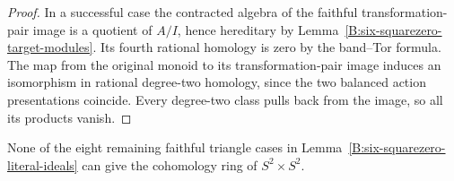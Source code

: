 \begin{proof}
In a successful case the contracted algebra of the faithful
transformation-pair image is a quotient of $A/I$, hence hereditary
by Lemma~\ref{B:six-squarezero-target-modules}.  Its fourth rational
homology is zero by the band--Tor formula.  The map from the
original monoid to its transformation-pair image induces an
isomorphism in rational degree-two homology, since the two
balanced action presentations coincide.  Every degree-two class
pulls back from the image, so all its products vanish.
\end{proof}

\begin{proposition}
\label{B:six-squarezero-triangle-affine}
None of the eight remaining faithful triangle cases in
Lemma~\ref{B:six-squarezero-literal-ideals} can give the cohomology
ring of $S^2\times S^2$.
\end{proposition}
